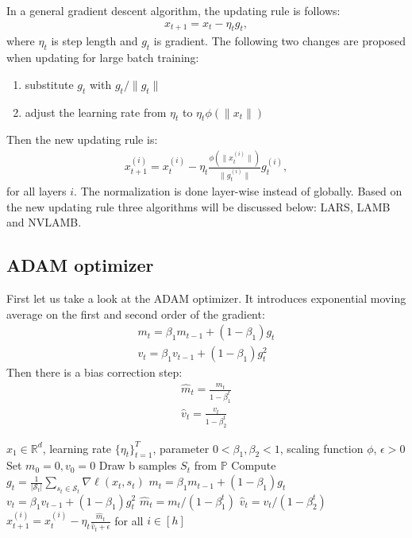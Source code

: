 In a general gradient descent algorithm, the updating rule is follows:
\begin{align*}
x_{t+1} = x_t - \eta_t g_t, 
\end{align*} 
where $\eta_t$ is step length and $g_t$ is gradient. The following two changes are proposed when updating for large batch training:
\begin{enumerate}
    \item substitute $g_t$ with $g_t/\|g_t\|$ 
    \item adjust the learning rate from $\eta_t$ to $\eta_t\phi(\|x_t\|)$
\end{enumerate}
Then the new updating rule is:
\begin{align*}
x_{t+1}^{(i)} = x_t^{(i)} - \eta_t \frac{\phi(\|x_t^{(i)}\|)}{\|g_t^{(i)}\|}g_t^{(i)}, 
\end{align*}
for all layers $i$. The normalization is done layer-wise instead of globally. 
Based on the new updating rule three algorithms will be discussed below: LARS, LAMB and NVLAMB.
\subsection*{ADAM optimizer}
First let us take a look at the ADAM optimizer. It introduces exponential moving average on the first and second order of the gradient:
\begin{align*}
m_{t} = \beta_{1}m_{t-1}+(1-\beta_{1})g_{t} \\
v_{t} = \beta_{1}v_{t-1}+(1-\beta_{1})g_{t}^2
\end{align*}
Then there is a bias correction step:
\begin{align*}
\hat{m}_{t}=\frac{m_t}{1-\beta_1^t} \\
\hat{v}_{t}=\frac{v_t}{1-\beta_2^t}
\end{align*}

\begin{minipage}[b]{.48\textwidth}
\begin{algorithm}[H]\small
	\caption{$ADAM$}
	\label{alg:adam}
	\begin{algorithmic}
		 $x_1 \in \mathbb{R}^d$, learning rate $\{\eta_t\}_{t=1}^T$, parameter $0 < \beta_{1}, \beta_{2} < 1$, scaling function $\phi$, $\epsilon > 0$
		\STATE Set $m_{0} = 0, v_{0} = 0$
		\STATE Draw b samples $S_t$ from $\mathbb{P}$
		\STATE Compute $g_t = \frac{1}{|\mathcal{S}_t|} \sum_{s_t \in \mathcal{S}_t}\nabla \ell(x_t, s_t)$
        \STATE $m_{t} = \beta_{1}m_{t-1}+(1-\beta_{1})g_{t}$
        \STATE $v_{t} = \beta_{1}v_{t-1}+(1-\beta_{1})g_{t}^2$
        \STATE $\hat{m}_{t}={m_t}/(1-\beta_1^t)$
        \STATE $\hat{v}_{t}={v_t}/(1-\beta_2^t)$
        \STATE $x_{t+1}^{(i)} = x_{t}^{(i)}-\eta_t\frac{\hat{m}_t}{\hat{v}_t+\epsilon}$ for all $i \in [h]$
		\ENDFOR
	\end{algorithmic}
\end{algorithm}
\end{minipage}\hfill%

